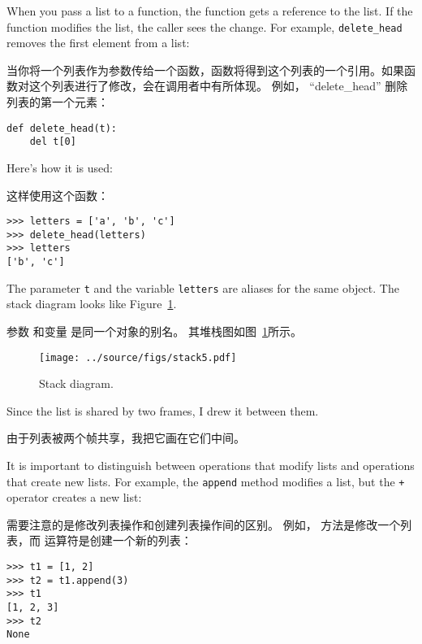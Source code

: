 When you pass a list to a function, the function gets a reference to
the list.  If the function modifies the list, the caller sees
the change.  For example, \verb"delete_head" removes the first element
from a list:

当你将一个列表作为参数传给一个函数，函数将得到这个列表的一个引用。如果函数对这个列表进行了修改，会在调用者中有所体现。 例如， ``delete\_head'' 删除列表的第一个元素：

\begin{lstlisting}
def delete_head(t):
    del t[0]
\end{lstlisting}

%
Here's how it is used:

这样使用这个函数：

\begin{lstlisting}
>>> letters = ['a', 'b', 'c']
>>> delete_head(letters)
>>> letters
['b', 'c']
\end{lstlisting}

%
The parameter {\tt t} and the variable {\tt letters} are
aliases for the same object.  The stack diagram looks like
Figure~\ref{fig.stack5}.

参数  和变量  是同一个对象的别名。
其堆栈图如图~\ref{fig.stack5}所示。

  

\begin{figure}
\centerline
{\texttt{[image: ../source/figs/stack5.pdf]}}
\caption{Stack diagram.}
\label{fig.stack5}
\end{figure}

Since the list is shared by two frames, I drew
it between them.

由于列表被两个帧共享，我把它画在它们中间。

It is important to distinguish between operations that
modify lists and operations that create new lists.  For
example, the {\tt append} method modifies a list, but the
{\tt +} operator creates a new list:

需要注意的是修改列表操作和创建列表操作间的区别。
例如， 方法是修改一个列表，而 \li{+} 运算符是创建一个新的列表：

  
  

%
\begin{lstlisting}
>>> t1 = [1, 2]
>>> t2 = t1.append(3)
>>> t1
[1, 2, 3]
>>> t2
None
\end{lstlisting}

